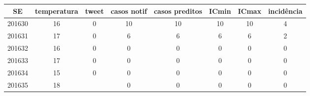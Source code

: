 \begin{tabular}{c|ccccccc}
  \hline
SE & temperatura & tweet & casos notif & casos preditos & ICmin & ICmax & incidência \\ 
  \hline
201630 & 16 & 0 & 10 & 10 & 10 & 10 & 4 \\ 
  201631 & 17 & 0 & 6 & 6 & 6 & 6 & 2 \\ 
  201632 & 16 & 0 & 0 & 0 & 0 & 0 & 0 \\ 
  201633 & 17 & 0 & 0 & 0 & 0 & 0 & 0 \\ 
  201634 & 15 & 0 & 0 & 0 & 0 & 0 & 0 \\ 
  201635 & 18 &  & 0 & 0 & 0 & 0 & 0 \\ 
   \hline
\end{tabular}
